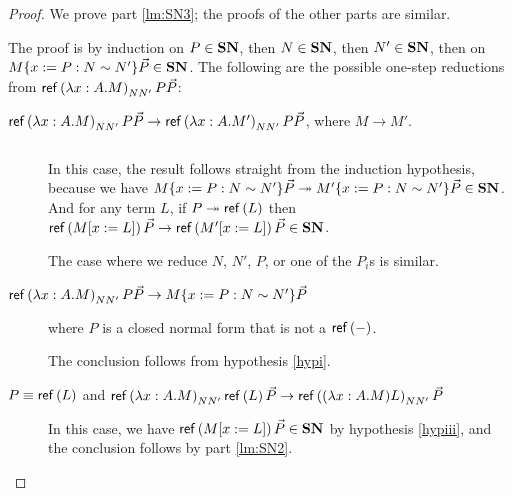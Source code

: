\begin{proof}
We prove part \ref{lm:SN3}; the proofs of the other parts are similar.

The proof is by induction on $P \in \mathbf{SN}$, then $N \in \mathbf{SN}$, then $N' \in \mathbf{SN}$,
then on $M\{x := P : N \sim N' \} \vec{P} \in \mathbf{SN}$.  The following are the possible one-step reductions from
$\mathsf{ref} \left( {\lambda x:A.M} \right)_{N N'} P \vec{P}$:

\begin{description}
\item[$\mathsf{ref} \left( {\lambda x:A.M} \right)_{N N'} P \vec{P} \rightarrow \mathsf{ref} \left( {\lambda x:A.M'} \right)_{N N'} P \vec{P}$, where $M \rightarrow M'$.]
$ $

In this case, the result follows straight from the induction hypothesis, because we have $M \{ x:=P : N \sim N' \} \vec{P} \twoheadrightarrow M' \{ x:=P : N \sim N' \} \vec{P} \in \mathbf{SN}$.
And for any term $L$, if $P \twoheadrightarrow \mathsf{ref} \left( {L} \right)$ then $\mathsf{ref} \left( {M[x:=L]} \right) \vec{P} \rightarrow \mathsf{ref} \left( {M'[x:=L]} \right) \vec{P} \in \mathbf{SN}$.

The case where we reduce $N$, $N'$, $P$, or one of the $P_i$s is similar.
\item[$\mathsf{ref} \left( {\lambda x:A.M} \right)_{N N'} P \vec{P} \rightarrow M \{ x := P : N \sim N' \} \vec{P}$] where $P$ is a closed normal form that is not a $\mathsf{ref} \left( {-} \right)$.

The conclusion follows from hypothesis \ref{hypi}.
\item[$P \equiv \mathsf{ref} \left( {L} \right)$ and $\mathsf{ref} \left( {\lambda x:A.M} \right)_{N N'} \mathsf{ref} \left( {L} \right) \vec{P} \rightarrow \mathsf{ref} \left( {(\lambda x:A.M)L} \right)_{N N'} \vec{P}$]

In this case, we have $\mathsf{ref} \left( {M[x:=L]} \right)\vec{P} \in \mathbf{SN}$ by hypothesis \ref{hypiii}, and the conclusion follows by part \ref{lm:SN2}.
\end{description}
\end{proof}





